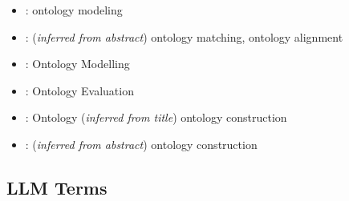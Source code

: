 \documentclass[a4paper,colorinlistoftodos]{article}
\begin{document}
\begin{itemize}
{      title}) Ontology Engineering
  \item \citet{norouzi2024OntologyPopulationUsing}: ontology modeling
  \item \citet{snijder2024AdvancingOntologyAlignment}: (\textit{inferred from
      abstract}) ontology matching, ontology alignment
  \item \citet{fathallah2024NeonGptLarge}: Ontology Modelling
  \item \citet{tsaneva2024LlmDrivenOntology}: Ontology Evaluation
  \item \citet{yang2024LlmSupportedApproach}: Ontology (\textit{inferred from
      title}) ontology construction
  \item \citet{zeginis2024ApplyingOntologyAware}: (\textit{inferred from
      abstract}) ontology construction
\end{itemize}

\subsection{LLM Terms}
\label{subsec:llm-terms}
\end{document}

